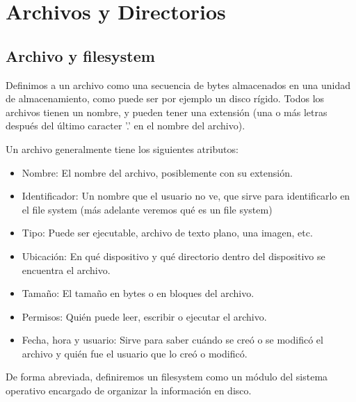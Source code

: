 \documentclass{article}
\begin{document}
\section{Archivos y Directorios}

\subsection{Archivo y filesystem}

Definimos a un archivo como una secuencia de bytes almacenados en una unidad de almacenamiento, como puede ser por ejemplo un disco r\'igido. Todos los archivos tienen un nombre, y pueden tener una extensi\'on (una o m\'as letras despu\'es del \'ultimo caracter '.' en el nombre del archivo).

Un archivo generalmente tiene los siguientes atributos:

\begin{itemize}
\item Nombre: El nombre del archivo, posiblemente con su extensi\'on.
\item Identificador: Un nombre que el usuario no ve, que sirve para identificarlo en el file system (m\'as adelante veremos qu\'e es un file system)
\item Tipo: Puede ser ejecutable, archivo de texto plano, una imagen, etc.
\item Ubicaci\'on: En qu\'e dispositivo y qu\'e directorio dentro del dispositivo se encuentra el archivo.
\item Tama\~no: El tama\~no en bytes o en bloques del archivo.
\item Permisos: Qui\'en puede leer, escribir o ejecutar el archivo.
\item Fecha, hora y usuario: Sirve para saber cu\'ando se cre\'o o se modific\'o el archivo y qui\'en fue el usuario que lo cre\'o o modific\'o.
\end{itemize}

De forma abreviada, definiremos un filesystem como un módulo del sistema operativo encargado de organizar la información en disco.
\end{document}
